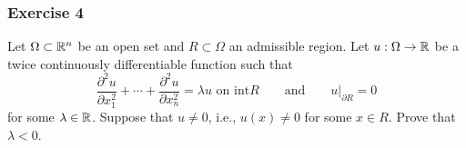 \documentclass[10pt, t, allowdisplaybreaks]{beamer}
\newcommand{\at}[3]{\left.#1\right\vert_{#2}^{#3}}
\begin{document}
\begin{frame}
    \frametitle{Exercise 4}
    \par Let $\Omega\subset \mathbb{R}^n$ be an open set and $R\subset \Omega$ an admissible region. Let $u:\Omega\rightarrow\mathbb{R}$ be a twice continuously differentiable 
    function such that 
    \begin{equation*}
        \frac{\partial^2 u}{\partial x^2_1} + \cdots + \frac{\partial^2 u}{\partial x^2_n} = \lambda u\text{ on int}R\qquad \text{and}\qquad \at{u}{\partial R}{} = 0
    \end{equation*}
    for some $\lambda\in\mathbb{R}$. Suppose that $u\neq 0$, i.e., $u(x)\neq 0$ for some $x\in R$. Prove that $\lambda<0$.
\end{frame}
\end{document}
